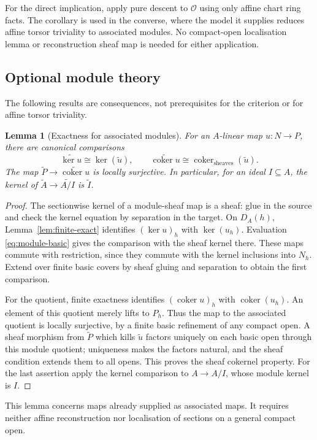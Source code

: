 \documentclass[11pt]{amsart}
\newtheorem{lemma}[theorem]{Lemma}
\theoremstyle{definition}\newtheorem{definition}[theorem]{Definition}
\theoremstyle{remark}\newtheorem{remark}[theorem]{Remark}
\newcommand{\OO}{\mathcal O}
\begin{document}
For the direct implication, apply pure descent to $\OO$ using only
affine chart ring facts. The corollary is used in the converse, where
the model it supplies reduces affine torsor triviality to associated
modules. No compact-open localisation lemma or reconstruction sheaf map
is needed for either application.

\subsection*{Optional module theory}
The following results are consequences, not prerequisites for the
criterion or for affine torsor triviality.
\begin{lemma}[Exactness for associated modules]\label{lem:associated-exact}
For an $A$-linear map $u:N\to P$, there are canonical comparisons
\[
 \widetilde{\ker u}\cong\ker(\widetilde u),\qquad
 \widetilde{\operatorname{coker}u}\cong
 \operatorname{coker}_{\mathrm{sheaves}}(\widetilde u).
\]
The map $\widetilde P\to\widetilde{\operatorname{coker}u}$ is locally
surjective. In particular, for an ideal $I\subseteq A$, the kernel of
$\widetilde A\to\widetilde{A/I}$ is $\widetilde I$.
\end{lemma}
\begin{proof}
The sectionwise kernel of a module-sheaf map is a sheaf: glue in the
source and check the kernel equation by separation in the target.
On $D_A(h)$, Lemma~\ref{lem:finite-exact} identifies
$(\ker u)_h$ with $\ker(u_h)$. Evaluation
\eqref{eq:module-basic} gives the comparison with the sheaf kernel
there. These maps commute with restriction, since they commute with
the kernel inclusions into $N_h$. Extend over finite basic covers by
sheaf gluing and separation to obtain the first comparison.

For the quotient, finite exactness identifies
$(\operatorname{coker}u)_h$ with $\operatorname{coker}(u_h)$.
An element of this quotient merely lifts to $P_h$. Thus the map to
the associated quotient is locally surjective, by a finite basic
refinement of any compact open. A sheaf morphism from $\widetilde P$
which kills $\widetilde u$ factors uniquely on each basic open through
this module quotient; uniqueness makes the factors natural, and the
sheaf condition extends them to all opens. This proves the sheaf
cokernel property. For the last assertion apply the kernel comparison
to $A\to A/I$, whose module kernel is $I$.
\end{proof}

This lemma concerns maps already supplied as associated maps. It
requires neither affine reconstruction nor localisation of sections
on a general compact open.
\end{document}
